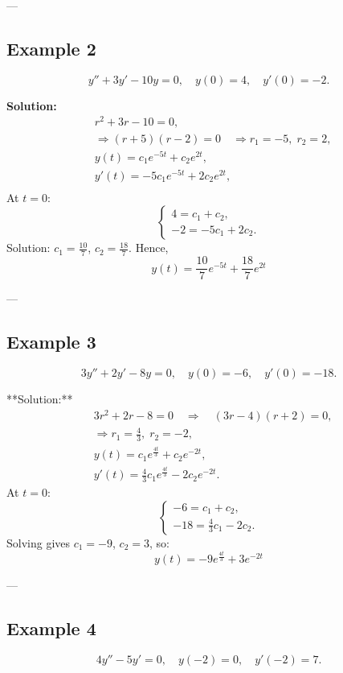 \documentclass[12pt]{book}
\begin{document}
---

\subsection*{Example 2}
\[
y'' + 3y' - 10y = 0, \quad y(0) = 4, \quad y'(0) = -2.
\]

\textbf{Solution:}
\[
\begin{aligned}
& r^2 + 3r - 10 = 0,\\
&\Rightarrow (r + 5)(r - 2) = 0 \quad \Longrightarrow r_1 = -5, \; r_2 = 2,\\
&y(t) = c_1 e^{-5t} + c_2 e^{2t},\\
&y'(t) = -5c_1 e^{-5t} + 2c_2 e^{2t},\\
\end{aligned}
\]
At \(t=0\):
\[
\begin{cases}
4 = c_1 + c_2, \\
-2 = -5c_1 + 2c_2.
\end{cases}
\]
Solution: \(c_1 = \tfrac{10}{7}\), \(c_2 = \tfrac{18}{7}\). Hence,
\[
\boxed{y(t) = \frac{10}{7}e^{-5t} + \frac{18}{7}e^{2t}}
\]

---

\subsection*{Example 3}
\[
3y'' + 2y' - 8y = 0, \quad y(0) = -6, \quad y'(0) = -18.
\]

**Solution:**
\[
\begin{aligned}
&3r^2 + 2r - 8 = 0 \quad\Rightarrow\quad (3r - 4)(r + 2) = 0,\\
&\Rightarrow r_1 = \tfrac{4}{3}, \; r_2 = -2,\\
&y(t) = c_1 e^{\frac{4t}{3}} + c_2 e^{-2t},\\
&y'(t) = \frac{4}{3}c_1 e^{\frac{4t}{3}} - 2c_2 e^{-2t}.
\end{aligned}
\]
At \(t = 0\):
\[
\begin{cases}
-6 = c_1 + c_2, \\
-18 = \tfrac{4}{3}c_1 - 2c_2.
\end{cases}
\]
Solving gives \(c_1 = -9\), \(c_2 = 3\), so:
\[
\boxed{y(t) = -9 e^{\frac{4t}{3}} + 3 e^{-2t}}
\]

---

\subsection*{Example 4}
\[
4y'' - 5y' = 0, \quad y(-2) = 0, \quad y'(-2) = 7.
\]
\end{document}
